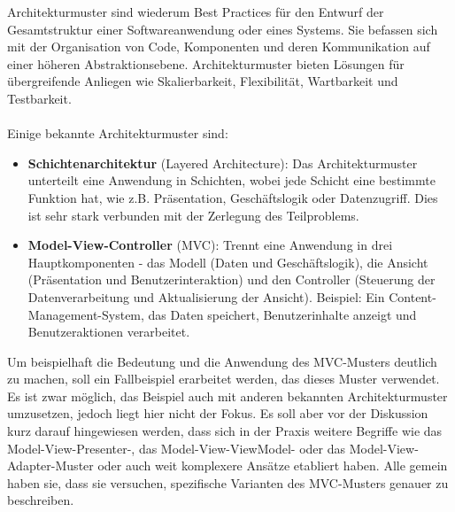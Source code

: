 \documentclass[../vs-script-first-v01.tex]{subfiles}
\begin{document}
Architekturmuster sind wiederum Best Practices für den Entwurf der Gesamtstruktur einer Softwareanwendung oder eines Systems. Sie befassen sich mit der Organisation von Code, Komponenten und deren Kommunikation auf einer höheren Abstraktionsebene. Architekturmuster bieten Lösungen für übergreifende Anliegen wie Skalierbarkeit, Flexibilität, Wartbarkeit und Testbarkeit.
\\\\
Einige bekannte Architekturmuster sind:
\begin{itemize}
\item \textbf{Schichtenarchitektur} (Layered Architecture): Das Architekturmuster unterteilt eine Anwendung in Schichten, wobei jede Schicht eine bestimmte Funktion hat, wie z.B. Präsentation, Geschäftslogik oder Datenzugriff. Dies ist sehr stark verbunden mit der Zerlegung des Teilproblems.
\item \textbf{Model-View-Controller} (MVC): Trennt eine Anwendung in drei Hauptkomponenten - das Modell (Daten und Geschäftslogik), die Ansicht (Präsentation und Benutzerinteraktion) und den Controller (Steuerung der Datenverarbeitung und Aktualisierung der Ansicht). Beispiel: Ein Content-Management-System, das Daten speichert, Benutzerinhalte anzeigt und Benutzeraktionen verarbeitet.
\end{itemize}
Um beispielhaft die Bedeutung und die Anwendung des MVC-Musters deutlich zu machen, soll ein Fallbeispiel erarbeitet werden, das dieses Muster verwendet. Es ist zwar möglich, das Beispiel auch mit anderen bekannten Architekturmuster umzusetzen, jedoch liegt hier nicht der Fokus. Es soll aber vor der Diskussion kurz darauf hingewiesen werden, dass sich in der Praxis  weitere Begriffe wie das Model-View-Presenter-, das Model-View-ViewModel- oder das Model-View-Adapter-Muster oder auch weit komplexere Ansätze etabliert haben. Alle gemein haben sie, dass sie versuchen, spezifische Varianten des MVC-Musters genauer zu beschreiben.
\end{document}
